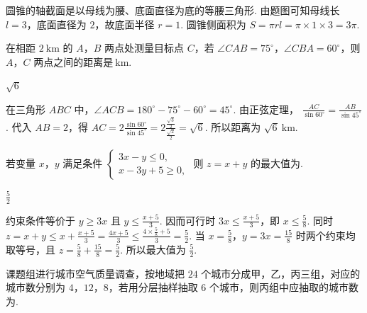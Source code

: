 \begin{solution}
圆锥的轴截面是以母线为腰、底面直径为底的等腰三角形. 由题图可知母线长 \(l=3\)，底面直径为 \(2\)，故底面半径 \(r=1\). 圆锥侧面积为 \(S=\pi rl=\pi\times1\times3=3\pi\).
\end{solution}

\begin{problem}
在相距 \(2\mathrm{~km}\) 的 \(A\)，\(B\) 两点处测量目标点 \(C\)，若 \(\angle CAB = 75^{\circ}\)，\(\angle CBA = 60^{\circ}\)，则 \(A\)，\(C\) 两点之间的距离是\fillinblank{}\(\mathrm{~km}\).
\end{problem}

\begin{answer}
\(\sqrt{6}\)
\end{answer}

\begin{solution}
在三角形 \(ABC\) 中，\(\angle ACB=180^{\circ}-75^{\circ}-60^{\circ}=45^{\circ}\). 由正弦定理，
\(\frac{AC}{\sin60^{\circ}}=\frac{AB}{\sin45^{\circ}}\). 代入 \(AB=2\)，得 \(AC=2\frac{\sin60^{\circ}}{\sin45^{\circ}}=2\frac{\frac{\sqrt3}{2}}{\frac{\sqrt2}{2}}=\sqrt6\). 所以距离为 \(\sqrt6\mathrm{~km}\).
\end{solution}

\begin{problem}
若变量 \(x\)，\(y\) 满足条件 \(\begin{cases}
3x - y \leqslant 0,\\
x - 3y + 5 \geqslant 0,
\end{cases}\) 则 \(z = x + y\) 的最大值为\fillinblank{}.
\end{problem}

\begin{answer}
\(\frac{5}{2}\)
\end{answer}

\begin{solution}
约束条件等价于 \(y\geqslant3x\) 且 \(y\leqslant\frac{x+5}{3}\). 因而可行时 \(3x\leqslant\frac{x+5}{3}\)，即 \(x\leqslant\frac58\). 同时
\(z=x+y\leqslant x+\frac{x+5}{3}=\frac{4x+5}{3}\leqslant\frac{4\times\frac58+5}{3}=\frac52\). 当 \(x=\frac58\)，\(y=3x=\frac{15}{8}\) 时两个约束均取等号，且 \(z=\frac58+\frac{15}{8}=\frac52\). 所以最大值为 \(\frac52\).
\end{solution}

\begin{problem}
课题组进行城市空气质量调查，按地域把 \(24\) 个城市分成甲，乙，丙三组，对应的城市数分别为 \(4\)，\(12\)，\(8\)，若用分层抽样抽取 \(6\) 个城市，则丙组中应抽取的城市数为\fillinblank{}.
\end{problem}

